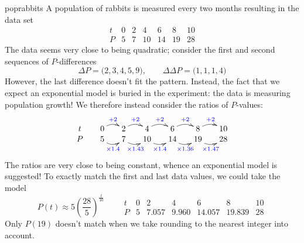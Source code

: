 \begin{example}{}{poprabbits}
A population of rabbits is measured every two months resulting in the data set
\[\begin{array}{c|cccccc}
t&0&2&4&6&8&10\\\hline
P&5&7&10&14&19&28
\end{array}\]
The data seems very close to being quadratic; consider the first and second sequences of $P$-differences
\[\Delta P=\bigl(2,3,4,5,9\bigr),\qquad \Delta\Delta P=\bigl(1,1,1,4\bigr)\]
However, the last difference doesn't fit the pattern. Instead, the fact that we expect an exponential model is buried in the experiment: the data is measuring population growth! We therefore instead consider the ratios of $P$-values:
\[
	\xymatrix @R0pt @C15pt{
		t & 0 \ar@/^/[r]^{\textcolor{blue}{+2}} & 2 \ar@/^/[r]^{\textcolor{blue}{+2}} & 4 \ar@/^/[r]^{\textcolor{blue}{+2}} & 6 \ar@/^/[r]^{\textcolor{blue}{+2}} & 8 \ar@/^/[r]^{\textcolor{blue}{+2}} & 10\\
		P & 5 \ar@/_/[r]_{\textcolor{blue}{\times 1.4}} & 7 \ar@/_/[r]_{\textcolor{blue}{\times 1.43}} & 10 \ar@/_/[r]_{\textcolor{blue}{\times 1.4}} & 14 \ar@/_/[r]_{\textcolor{blue}{\times 1.36}} & 19 \ar@/_/[r]_{\textcolor{blue}{\times 1.47}} & 28
	}
\]
The ratios are very close to being constant, whence an exponential model is suggested! To exactly match the first and last data values, we could take the model
\[P(t)\approx 5\left(\frac{28}5\right)^{\frac t{10}}\qquad \begin{array}{c|cccccc}
t&0&2&4&6&8&10\\\hline
P&5&7.057&9.960&14.057&19.839&28
\end{array}\]
Only $P(19)$ doesn't match when we take rounding to the nearest integer into account.

% 
% 
\end{example}


